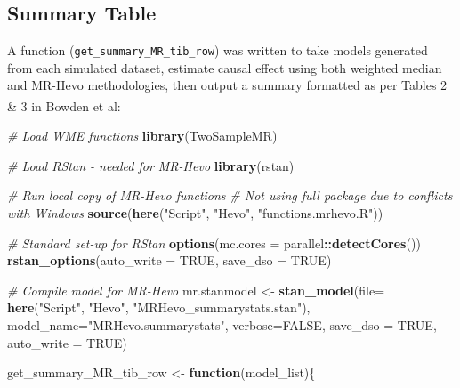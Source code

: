 \documentclass[
]{article}
\newenvironment{Shaded}{\begin{snugshade}}{\end{snugshade}}
\newcommand{\AttributeTok}[1]{\textcolor[rgb]{0.13,0.29,0.53}{#1}}
\newcommand{\CommentTok}[1]{\textcolor[rgb]{0.56,0.35,0.01}{\textit{#1}}}
\newcommand{\ConstantTok}[1]{\textcolor[rgb]{0.56,0.35,0.01}{#1}}
\newcommand{\ControlFlowTok}[1]{\textcolor[rgb]{0.13,0.29,0.53}{\textbf{#1}}}
\newcommand{\FunctionTok}[1]{\textcolor[rgb]{0.13,0.29,0.53}{\textbf{#1}}}
\newcommand{\NormalTok}[1]{#1}
\newcommand{\OtherTok}[1]{\textcolor[rgb]{0.56,0.35,0.01}{#1}}
\newcommand{\SpecialCharTok}[1]{\textcolor[rgb]{0.81,0.36,0.00}{\textbf{#1}}}
\newcommand{\StringTok}[1]{\textcolor[rgb]{0.31,0.60,0.02}{#1}}
\begin{document}
\newpage

\subsection{Summary Table}\label{appendix-sim-summ}

A function (\texttt{get\_summary\_MR\_tib\_row}) was written to take models generated from each simulated dataset, estimate causal effect using both weighted median and MR-Hevo methodologies, then output a summary formatted as per Tables 2 \& 3 in Bowden et al\textsuperscript{}:

\begin{Shaded}
\begin{Highlighting}[]
\CommentTok{\# Load WME functions}
\FunctionTok{library}\NormalTok{(TwoSampleMR)}

\CommentTok{\# Load RStan {-} needed for MR{-}Hevo}
\FunctionTok{library}\NormalTok{(rstan)}


\CommentTok{\# Run local copy of MR{-}Hevo functions}
\CommentTok{\# Not using full package due to conflicts with Windows}
\FunctionTok{source}\NormalTok{(}\FunctionTok{here}\NormalTok{(}\StringTok{"Script"}\NormalTok{, }\StringTok{"Hevo"}\NormalTok{, }\StringTok{"functions.mrhevo.R"}\NormalTok{))}

\CommentTok{\# Standard set{-}up for RStan}
\FunctionTok{options}\NormalTok{(}\AttributeTok{mc.cores =}\NormalTok{ parallel}\SpecialCharTok{::}\FunctionTok{detectCores}\NormalTok{())}
\FunctionTok{rstan\_options}\NormalTok{(}\AttributeTok{auto\_write =} \ConstantTok{TRUE}\NormalTok{, }\AttributeTok{save\_dso =} \ConstantTok{TRUE}\NormalTok{)}


\CommentTok{\# Compile model for MR{-}Hevo}
\NormalTok{mr.stanmodel }\OtherTok{\textless{}{-}} \FunctionTok{stan\_model}\NormalTok{(}\AttributeTok{file=} \FunctionTok{here}\NormalTok{(}\StringTok{"Script"}\NormalTok{, }
                                      \StringTok{"Hevo"}\NormalTok{, }
                                      \StringTok{"MRHevo\_summarystats.stan"}\NormalTok{),}
                           \AttributeTok{model\_name=}\StringTok{"MRHevo.summarystats"}\NormalTok{, }
                           \AttributeTok{verbose=}\ConstantTok{FALSE}\NormalTok{,}
                           \AttributeTok{save\_dso =} \ConstantTok{TRUE}\NormalTok{,}
                           \AttributeTok{auto\_write =} \ConstantTok{TRUE}\NormalTok{)}

\NormalTok{get\_summary\_MR\_tib\_row }\OtherTok{\textless{}{-}} \ControlFlowTok{function}\NormalTok{(model\_list)\{}
  

\end{Highlighting}
\end{Shaded}
\end{document}
